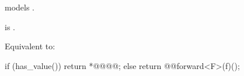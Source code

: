 \begin{itemdescr}
\pnum
\constraints
{} models .

\pnum
\mandates
{} is .

\pnum
\effects
Equivalent to:
\begin{codeblock}
if (has_value()) {
  return *@@@@;
} else {
  return @@forward<F>(f)();
}
\end{codeblock}
\end{itemdescr}
